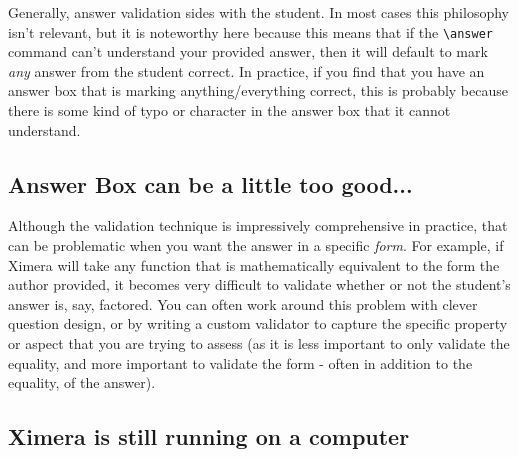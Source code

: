 \documentclass{ximera}
\begin{document}
            Generally, answer validation sides with the student. In most cases this philosophy isn't relevant, but it is noteworthy here because this means that if the \verb|\answer| command can't understand your provided answer, then it will default to mark \textit{any} answer from the student correct. In practice, if you find that you have an answer box that is marking anything/everything correct, this is probably because there is some kind of typo or character in the answer box that it cannot understand.
    
        \subsection*{Answer Box can be a little too good...} 
            
            Although the validation technique is impressively comprehensive in practice, that can be problematic when you want the answer in a specific \textit{form}. For example, if Ximera will take any function that is mathematically equivalent to the form the author provided, it becomes very difficult to validate whether or not the student's answer is, say, factored. You can often work around this problem with clever question design, or by writing a custom validator to capture the specific property or aspect that you are trying to assess (as it is less important to only validate the equality, and more important to validate the form - often in addition to the equality, of the answer).
            
        \subsection*{Ximera is still running on a computer}
            
\end{document}
